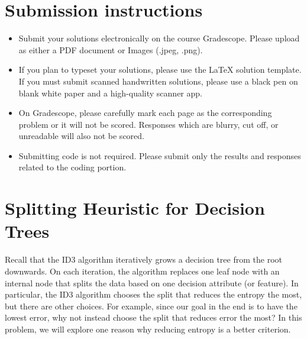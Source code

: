 \documentclass[11pt]{article}
\begin{document}
\author{}
\date{}
\vspace{-1in}
\maketitle
\vspace{-0.75in}


\ifsoln
\else
\section*{Submission instructions}
\begin{itemize}
\item 
Submit your solutions electronically on the course Gradescope. Please upload as either a PDF document or Images (.jpeg, .png).
\item If you plan to typeset your solutions, please use the LaTeX solution template. If you must submit scanned handwritten solutions, please use a black pen on blank white paper and a high-quality scanner app.
\item On Gradescope, please carefully mark each page as the corresponding problem or it will not be scored. Responses which are blurry, cut off, or unreadable will also not be scored.
\item Submitting code is not required. Please submit only the results and responses related to the coding portion.
\end{itemize}
\fi


\ifnotsolution{\newpage}
\section{Splitting Heuristic for Decision Trees }
Recall that the ID3 algorithm iteratively grows a decision tree from the root downwards. On each iteration, the algorithm replaces one leaf node with an internal node that splits the data based on one decision attribute (or feature). In particular, the ID3 algorithm chooses the split that reduces the entropy the most, but there are other choices. For example, since our goal in the end is to have the lowest error, why not instead choose the split that reduces error the most? In this problem, we will explore one reason why reducing entropy is a better criterion.
\end{document}
